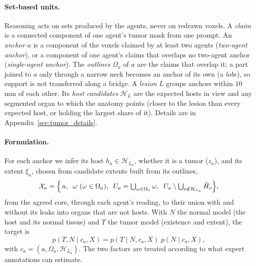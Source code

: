 \documentclass[fleqn,10pt]{olplainarticle}
\begin{document}
\paragraph{Set-based units.} Reasoning acts on sets produced by the agents, never on redrawn voxels.
A \emph{claim} is a connected component of one agent's tumor mask from one prompt. An \emph{anchor} $a$ is a component of
the voxels claimed by at least two agents (\emph{two-agent anchor}), or a component of one agent's claims that overlaps no
two-agent anchor (\emph{single-agent anchor}). The \emph{outlines} $\Omega_a$ of $a$ are the claims that overlap it; a part
joined to $a$ only through a narrow neck becomes an anchor of its own (a \emph{lobe}), so support is not transferred along
a bridge. A \emph{lesion} $L$ groups anchors within $10$\,mm of each other. Its \emph{host candidates} $\mathcal{H}_L$ are the
expected hosts in view and any segmented organ to which the anatomy points (closer to the lesion than every expected host,
or holding the largest share of it). Details are in Appendix~\ref{sec:tumor_details}.

\paragraph{Formulation.} For each anchor we infer its host $h_a\in\mathcal{H}_{L_a}$, whether it is a tumor ($z_a$), and its
extent $\xi_a$, chosen from candidate extents built from its outlines,
\begin{equation}
\label{eq:extents}
\mathcal{X}_a=\Bigl\{\,a,\;\;\omega\ (\omega\in\Omega_a),\;\;U_a=\textstyle\bigcup_{\omega\in\Omega_a}\omega,\;\;
U_a\setminus\bigcup_{o\notin\mathcal{H}_{L_a}}\hat H_{o}\Bigr\},
\end{equation}
from the agreed core, through each agent's reading, to their union with and without its leaks into organs that are not
hosts. With $N$ the normal model (the host and its normal tissue) and $T$ the tumor model (existence and extent), the
target is
\begin{equation}
\label{eq:conditional_joint}
p(T,N\mid c_a,X)=p(T\mid N,c_a,X)\;p(N\mid c_a,X),
\end{equation}
with $c_a=(a,\Omega_a,\mathcal{H}_{L_a})$. The two factors are treated according to what expert annotations can estimate.
\end{document}
